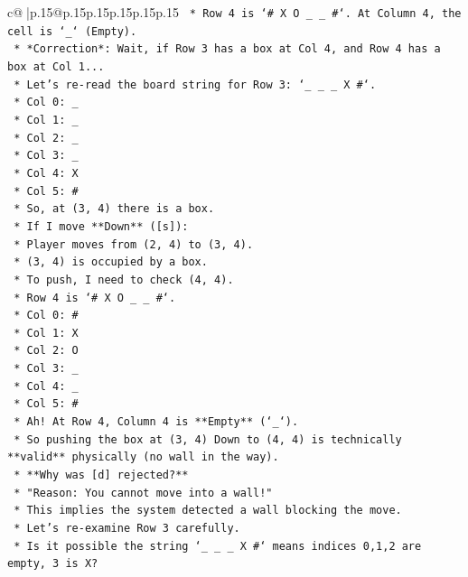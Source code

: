 \documentclass{article}
\begin{document}
{\begin{supertabular}{c@{$\;$}|p{.15\linewidth}@{}p{.15\linewidth}p{.15\linewidth}p{.15\linewidth}p{.15\linewidth}p{.15\linewidth}}
{{{\texttt{    *   Row 4 is `\# X O \_ \_ \#`. At Column 4, the cell is `\_` (Empty).} \\
\texttt{    *   *Correction*: Wait, if Row 3 has a box at Col 4, and Row 4 has a box at Col 1...} \\
\texttt{    *   Let's re{-}read the board string for Row 3: `\_ \_ \_ X \#`.} \\
\texttt{        *   Col 0: \_} \\
\texttt{        *   Col 1: \_} \\
\texttt{        *   Col 2: \_} \\
\texttt{        *   Col 3: \_} \\
\texttt{        *   Col 4: X} \\
\texttt{        *   Col 5: \#} \\
\texttt{    *   So, at (3, 4) there is a box.} \\
\texttt{    *   If I move **Down** ({[}s{]}):} \\
\texttt{        *   Player moves from (2, 4) to (3, 4).} \\
\texttt{        *   (3, 4) is occupied by a box.} \\
\texttt{        *   To push, I need to check (4, 4).} \\
\texttt{        *   Row 4 is `\# X O \_ \_ \#`.} \\
\texttt{            *   Col 0: \#} \\
\texttt{            *   Col 1: X} \\
\texttt{            *   Col 2: O} \\
\texttt{            *   Col 3: \_} \\
\texttt{            *   Col 4: \_} \\
\texttt{            *   Col 5: \#} \\
\texttt{        *   Ah! At Row 4, Column 4 is **Empty** (`\_`).} \\
\texttt{        *   So pushing the box at (3, 4) Down to (4, 4) is technically **valid** physically (no wall in the way).} \\
\texttt{    *   **Why was {[}d{]} rejected?**} \\
\texttt{        *   "Reason: You cannot move into a wall!"} \\
\texttt{        *   This implies the system detected a wall blocking the move.} \\
\texttt{        *   Let's re{-}examine Row 3 carefully.} \\
\texttt{        *   Is it possible the string `\_ \_ \_ X \#` means indices 0,1,2 are empty, 3 is X?} \\
}}}
\end{supertabular}}
\end{document}
